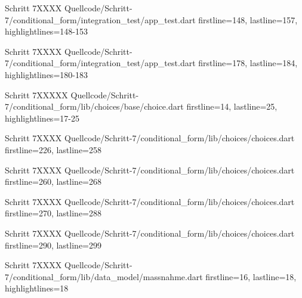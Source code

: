 \begin{alexlistingzwei}{Schritt 7}{XXXX}
    {Quellcode/Schritt-7/conditional_form/integration_test/app_test.dart}
    {firstline=148, lastline=157, highlightlines={148-153}}
    \label{lst:Schritt5XXXX}
  \end{alexlistingzwei}

  \begin{alexlistingzwei}{Schritt 7}{XXXX}
    {Quellcode/Schritt-7/conditional_form/integration_test/app_test.dart}
    {firstline=178, lastline=184, highlightlines={180-183}}
    \label{lst:Schritt5XXXX}
  \end{alexlistingzwei}


  \begin{alexlistingzwei}{Schritt 7}{XXXXX}
    {Quellcode/Schritt-7/conditional_form/lib/choices/base/choice.dart}
    {firstline=14, lastline=25, highlightlines={17-25}}
    \label{lst:Schritt4XXXXX}
  \end{alexlistingzwei}

  \begin{alexlistingzwei}{Schritt 7}{XXXX}
    {Quellcode/Schritt-7/conditional_form/lib/choices/choices.dart}
    {firstline=226, lastline=258}
    \label{lst:Schritt5XXXX}
  \end{alexlistingzwei}

  \begin{alexlistingzwei}{Schritt 7}{XXXX}
    {Quellcode/Schritt-7/conditional_form/lib/choices/choices.dart}
    {firstline=260, lastline=268}
    \label{lst:Schritt5XXXX}
  \end{alexlistingzwei}

  \begin{alexlistingzwei}{Schritt 7}{XXXX}
    {Quellcode/Schritt-7/conditional_form/lib/choices/choices.dart}
    {firstline=270, lastline=288}
    \label{lst:Schritt5XXXX}
  \end{alexlistingzwei}

  \begin{alexlistingzwei}{Schritt 7}{XXXX}
    {Quellcode/Schritt-7/conditional_form/lib/choices/choices.dart}
    {firstline=290, lastline=299}
    \label{lst:Schritt5XXXX}
  \end{alexlistingzwei}


  \begin{alexlistingzwei}{Schritt 7}{XXXX}
    {Quellcode/Schritt-7/conditional_form/lib/data_model/massnahme.dart}
    {firstline=16, lastline=18, highlightlines={18}}
    \label{lst:Schritt5XXXX}
  \end{alexlistingzwei}

